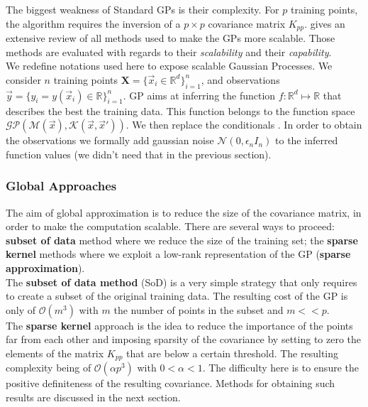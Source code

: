 The biggest weakness of Standard GPs is their complexity. For $p$ training points, the algorithm requires the inversion of a $p \times p$ covariance matrix $K_{pp}$. \citet{liu_when_2018} gives an extensive review of all methods used to make the GPs more scalable. Those methods are evaluated with regards to their \textit{scalability} and their \textit{capability}. \\ 

We redefine notations used here to expose scalable Gaussian Processes.  We consider $n$ training points $\mathbf{X}= \{\vec{x}_i \in \mathbb{R}^d \}^n_{i=1}$, and observations $\vec{y} = \{y_i = y(\vec{x}_i) \in \mathbb{R} \}^n_{i=1} $. GP aims at inferring the function $f : \mathbb{R}^d \mapsto \mathbb{R}$ that describes the best the training data. This function belongs to the  function space $\mathcal{GP}(\mathcal{M}(\vec{x}), \mathcal{K}(\vec{x},\vec{x}'))$. We then replace the conditionals .  In order to obtain the observations we formally add gaussian noise $\mathcal{N}(0,\epsilon_nI_n)$ to the inferred function values (we didn't need that in the previous section). 
\subsubsection{Global Approaches}

The aim of global approximation is to reduce the size of the covariance matrix, in order to make the computation scalable. There are several ways to proceed: \textbf{subset of data} method where we reduce the size of the training set; the \textbf{sparse kernel} methods where we exploit a low-rank representation of the GP (\textbf{sparse approximation}). \\ 


The \textbf{subset of data method} (SoD) is a very simple strategy that only requires to create a subset of the original training data. The resulting cost of the GP is only of $\mathcal{O}(m^3)$ with $m$ the number of points in the subset and $m << p$.  \\

The \textbf{sparse kernel} approach is the idea to reduce the importance of the points far from each other and imposing sparsity of the covariance by setting to zero the elements of the matrix $K_{pp}$ that are below a certain threshold. The resulting complexity being of $\mathcal{O}(\alpha p^3)$ with $0 < \alpha < 1$. The difficulty here is to ensure the positive definiteness of the resulting covariance. Methods for obtaining such results are discussed in the next section. \\

